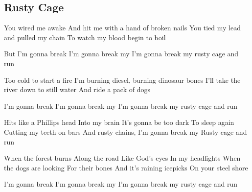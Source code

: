 \subsection*{Rusty Cage   }



\begin{guitar}


You wired me awake
And hit me with a hand of broken nails
You tied my lead and pulled my chain
To watch my blood begin to boil

But I'm gonna break
I'm gonna break my
I'm gonna break my rusty cage and run

Too cold to start a fire
I'm burning diesel, burning dinosaur bones
I'll take the river down to still water
And ride a pack of dogs

I'm gonna break
I'm gonna break my
I'm gonna break my rusty cage and run

Hits like a Phillips head Into my brain
It's gonna be too dark
To sleep again Cutting my teeth on bars
And rusty chains,
I'm gonna break my Rusty cage and run

When the forest burns
Along the road Like God's eyes In my headlights
When the dogs are looking
For their bones
And it's raining icepicks
On your steel shore

I'm gonna break
I'm gonna break my
I'm gonna break my rusty cage and run

\end{guitar}
